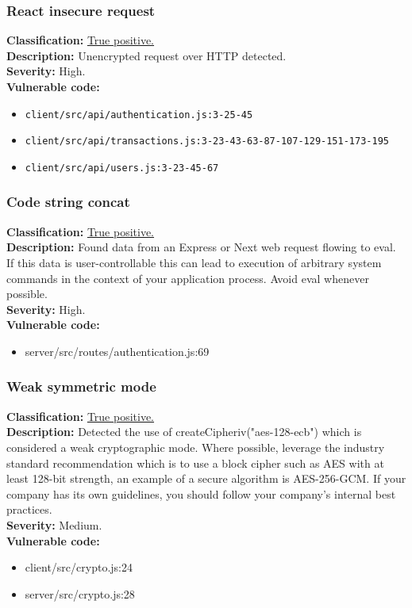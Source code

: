 \documentclass[]{article}
\begin{document}
\subsubsection{React insecure request}
\textbf{Classification:} \hyperref[subsubsec:cleartext_transmission_of_sensitive_information]{True positive.} \\ 
\textbf{Description:} Unencrypted request over HTTP detected. \\ 
\textbf{Severity:} High. \\ 
\textbf{Vulnerable code:} 
\begin{itemize}
    \item \texttt{client/src/api/authentication.js:3-25-45}
    \item \texttt{client/src/api/transactions.js:3-23-43-63-87-107-129-151-173-195}
    \item \texttt{client/src/api/users.js:3-23-45-67}
\end{itemize}

\subsubsection{Code string concat}
\textbf{Classification:} \hyperref[subsubsec:improper_neutralization_of_directives_in_dynamically_evaluated_code]{True positive.} \\ 
\textbf{Description:} Found data from an Express or Next web request flowing to eval. If this data is user-controllable this can 
lead to execution of arbitrary system commands in the context of your application process. Avoid eval whenever possible. \\ 
\textbf{Severity:} High. \\ 
\textbf{Vulnerable code:} 
\begin{itemize}
    \item server/src/routes/authentication.js:69
\end{itemize}

\subsubsection{Weak symmetric mode}
\textbf{Classification:} \hyperref[subsubsec:use_of_a_broken_or_risky_cryptographic_algorithm]{True positive.} \\ 
\textbf{Description:} Detected the use of createCipheriv("aes-128-ecb") which is considered a weak cryptographic mode. Where possible, 
leverage the industry standard recommendation which is to use a block cipher such as AES with at least 128-bit strength, an example 
of a secure algorithm is AES-256-GCM. If your company has its own guidelines, you should follow your company's internal best practices. \\ 
\textbf{Severity:} Medium. \\ 
\textbf{Vulnerable code:} 
\begin{itemize}
    \item client/src/crypto.js:24
    \item server/src/crypto.js:28
\end{itemize}
\end{document}
